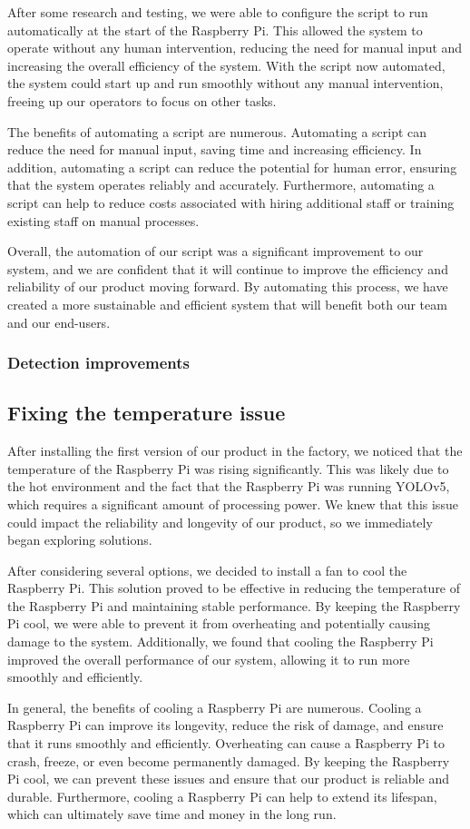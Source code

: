 After some research and testing, we were able to configure the script to run automatically at the start of the Raspberry Pi. This allowed the system to operate without any human intervention, reducing the need for manual input and increasing the overall efficiency of the system. With the script now automated, the system could start up and run smoothly without any manual intervention, freeing up our operators to focus on other tasks.

The benefits of automating a script are numerous. Automating a script can reduce the need for manual input, saving time and increasing efficiency. In addition, automating a script can reduce the potential for human error, ensuring that the system operates reliably and accurately. Furthermore, automating a script can help to reduce costs associated with hiring additional staff or training existing staff on manual processes.

Overall, the automation of our script was a significant improvement to our system, and we are confident that it will continue to improve the efficiency and reliability of our product moving forward. By automating this process, we have created a more sustainable and efficient system that will benefit both our team and our end-users.
\subsubsection{Detection improvements}
\subsection{Fixing the temperature issue}
After installing the first version of our product in the factory, we noticed that the temperature of the Raspberry Pi was rising significantly. This was likely due to the hot environment and the fact that the Raspberry Pi was running YOLOv5, which requires a significant amount of processing power. We knew that this issue could impact the reliability and longevity of our product, so we immediately began exploring solutions.

After considering several options, we decided to install a fan to cool the Raspberry Pi. This solution proved to be effective in reducing the temperature of the Raspberry Pi and maintaining stable performance. By keeping the Raspberry Pi cool, we were able to prevent it from overheating and potentially causing damage to the system. Additionally, we found that cooling the Raspberry Pi improved the overall performance of our system, allowing it to run more smoothly and efficiently.

In general, the benefits of cooling a Raspberry Pi are numerous. Cooling a Raspberry Pi can improve its longevity, reduce the risk of damage, and ensure that it runs smoothly and efficiently. Overheating can cause a Raspberry Pi to crash, freeze, or even become permanently damaged. By keeping the Raspberry Pi cool, we can prevent these issues and ensure that our product is reliable and durable. Furthermore, cooling a Raspberry Pi can help to extend its lifespan, which can ultimately save time and money in the long run.


%




%